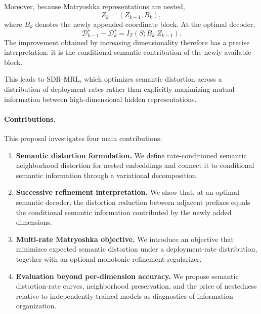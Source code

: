\documentclass[11pt]{article}
\newcommand{\cD}{\mathcal{D}}
\begin{document}
Moreover, because Matryoshka representations are nested,
\begin{equation}
    Z_k=(Z_{k-1},B_k),
\end{equation}
where $B_k$ denotes the newly appended coordinate block.
At the optimal decoder,
\begin{equation}
\boxed{
\cD_{k-1}^\star-\cD_k^\star
=
I_T(S;B_k|Z_{k-1}).
}
\end{equation}
The improvement obtained by increasing dimensionality therefore has a precise interpretation: it is the conditional semantic contribution of the newly available block.

This leads to SDR-MRL, which optimizes semantic distortion across a distribution of deployment rates rather than explicitly maximizing mutual information between high-dimensional hidden representations.

\paragraph{Contributions.}
This proposal investigates four main contributions:

\begin{enumerate}[leftmargin=1.5em]
    \item \textbf{Semantic distortion formulation.}
    We define rate-conditioned semantic neighborhood distortion for nested embeddings and connect it to conditional semantic information through a variational decomposition.

    \item \textbf{Successive refinement interpretation.}
    We show that, at an optimal semantic decoder, the distortion reduction between adjacent prefixes equals the conditional semantic information contributed by the newly added dimensions.

    \item \textbf{Multi-rate Matryoshka objective.}
    We introduce an objective that minimizes expected semantic distortion under a deployment-rate distribution, together with an optional monotonic refinement regularizer.

    \item \textbf{Evaluation beyond per-dimension accuracy.}
    We propose semantic distortion-rate curves, neighborhood preservation, and the price of nestedness relative to independently trained models as diagnostics of information organization.
\end{enumerate}


\end{document}
